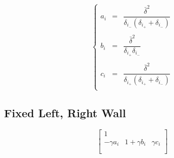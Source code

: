 \documentclass[aps,11pt]{revtex4}
\begin{document}
\begin{equation}
\left\lbrace
\begin{array}{rcc}
	a_i & = & \dfrac{\bar{\delta}^2}{\delta_{i_-}(\delta_{i_+}+\delta_{i_-})}\\
	\\
	b_i & = & \dfrac{\bar{\delta}^2}{\delta_{i_+}\delta_{i_-}}\\
	\\
	c_i & = & \dfrac{\bar{\delta}^2}{\delta_{i_+}(\delta_{i_+}+\delta_{i_-})}\\
\end{array}
\right.
\end{equation}

\subsection{Fixed Left, Right Wall}
\begin{equation}
\begin{bmatrix}
1 & \\
-\gamma a_i & 1+ \gamma b_i & \gamma c_i \\
            &               & \\
\end{bmatrix}
\end{equation}
\end{document}
